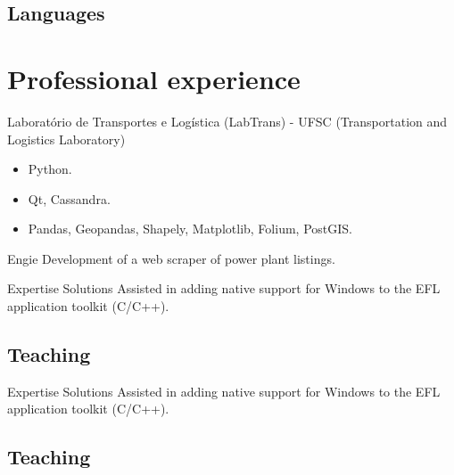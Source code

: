\documentclass[11pt,a4paper]{moderncv}
\begin{document}
    \subsection{Languages}

\newpage


\section{Professional experience}
    {Laboratório de Transportes e Logística (LabTrans) - UFSC}
    {(Transportation and Logistics Laboratory)}{}{
        \begin{itemize}
            \item Python.
            \item Qt, Cassandra.
            \item Pandas, Geopandas, Shapely, Matplotlib, Folium, PostGIS.
        \end{itemize}
    }

    {Engie}
    {}{}{Development of a web scraper of power plant listings.}

    {Expertise Solutions}
    {}{}{Assisted in adding native support for Windows to the EFL application toolkit (C/C++).}

    \subsection{Teaching}

    {Expertise Solutions}
    {}{}{Assisted in adding native support for Windows to the EFL application toolkit (C/C++).}

    \subsection{Teaching}
\end{document}
